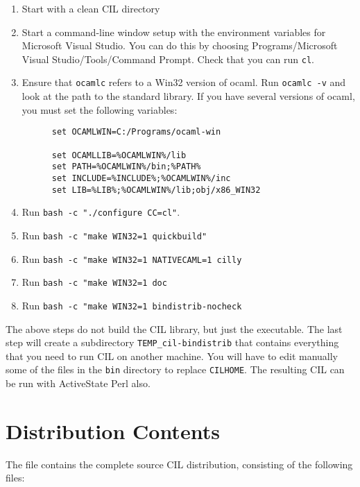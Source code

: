 \documentclass{article}
\def\t#1{{\tt #1}}
\begin{document}
\begin{enumerate}
\item Start with a clean CIL directory
\item Start a command-line window setup with the environment variables for
  Microsoft Visual Studio. You can do this by choosing Programs/Microsoft
  Visual Studio/Tools/Command Prompt. Check that you can run \t{cl}. 
\item Ensure that \t{ocamlc} refers to a Win32 version of ocaml. Run \t{ocamlc
  -v} and look at the path to the standard library. If you have several
  versions of ocaml, you must set the following variables:
   \begin{verbatim}
      set OCAMLWIN=C:/Programs/ocaml-win

      set OCAMLLIB=%OCAMLWIN%/lib
      set PATH=%OCAMLWIN%/bin;%PATH%
      set INCLUDE=%INCLUDE%;%OCAMLWIN%/inc
      set LIB=%LIB%;%OCAMLWIN%/lib;obj/x86_WIN32
   \end{verbatim}

\item Run \t{bash -c "./configure CC=cl"}.
\item Run \t{bash -c "make WIN32=1 quickbuild"}
\item Run \t{bash -c "make WIN32=1 NATIVECAML=1 cilly}
\item Run \t{bash -c "make WIN32=1 doc}
\item Run \t{bash -c "make WIN32=1 bindistrib-nocheck}
\end{enumerate}

 The above steps do not build the CIL library, but just the executable. The
last step will create a subdirectory \t{TEMP\_cil-bindistrib} that contains
everything that you need to run CIL on another machine. You will have to edit
manually some of the files in the \t{bin} directory to replace \t{CILHOME}.
The resulting CIL can be run with ActiveState Perl also. 


  \section{Distribution Contents}

The file  
contains the complete source CIL distribution, 
consisting of the following files:
\end{document}

